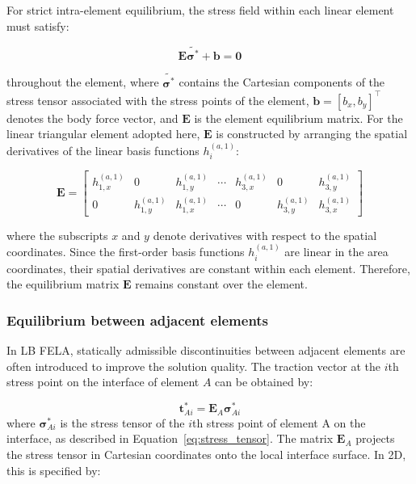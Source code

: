 For strict intra-element equilibrium, the stress field within each linear element must satisfy:

\begin{equation}
\boldsymbol{E}\tilde{\boldsymbol{\sigma}^*}+\boldsymbol{b}=\boldsymbol{0}
\end{equation}

throughout the element, where $\tilde{\boldsymbol{\sigma}^*}$ contains the Cartesian components of the stress tensor associated with the stress points of the element, $\boldsymbol{b}=[b_x,b_y]^\top$ denotes the body force vector, and $\boldsymbol{E}$ is the element equilibrium matrix. For the linear triangular element adopted here, $\boldsymbol{E}$ is constructed by arranging the spatial derivatives of the linear basis functions $h_i^{(a,1)}$:

\begin{equation}
\boldsymbol{E}=
\begin{bmatrix}
h_{1,x}^{(a,1)} & 0 & h_{1,y}^{(a,1)} & \cdots & h_{3,x}^{(a,1)} & 0 & h_{3,y}^{(a,1)}\\
0 & h_{1,y}^{(a,1)} & h_{1,x}^{(a,1)} & \cdots & 0 & h_{3,y}^{(a,1)} & h_{3,x}^{(a,1)}
\end{bmatrix}
\label{eq:init_system}
\end{equation}

where the subscripts $x$ and $y$ denote derivatives with respect to the spatial coordinates. Since the first-order basis functions $h_i^{(a,1)}$ are linear in the area coordinates, their spatial derivatives are constant within each element. Therefore, the equilibrium matrix $\boldsymbol{E}$ remains constant over the element.


\subsubsection{Equilibrium between adjacent elements}

In LB FELA, statically admissible discontinuities between adjacent elements are often introduced to improve the solution quality. The traction vector at the $i$th stress point on the interface of element $A$ can be obtained by:

\begin{equation}
\boldsymbol{t}^*_{Ai} = \boldsymbol{E}_A\boldsymbol{\sigma}_{Ai}^*
\label{eq:traction}
\end{equation} where $\boldsymbol{\sigma}_{Ai}^*$ is the stress tensor of the $i$th stress point of element A on the interface, as described in Equation~\eqref{eq:stress_tensor}. The matrix $\boldsymbol{E}_A$ projects the stress tensor in Cartesian coordinates onto the local interface surface. In 2D, this is specified by:

